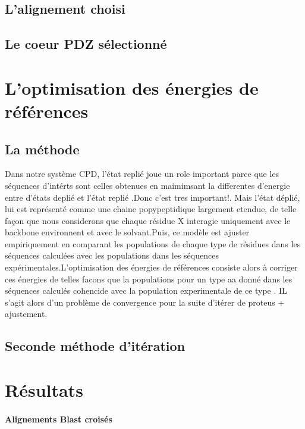 \subsection{L'alignement choisi}

\subsection{Le coeur PDZ sélectionné}


\section{L'optimisation des énergies de références} 
\label{sec:optERef}
\subsection{La méthode}
Dans notre système CPD, l'état replié joue un role important parce que les séquences d'intérts sont celles obtenues en maimimsant la differentes d'energie entre d'états deplié et l'état replié .Donc c'est tres important!.
Mais l'état déplié, lui est représenté comme une chaine popypeptidique largement etendue, de telle façon que nous considerons que chaque résidue X interagie uniquement avec le backbone environnent et avec le solvant.Puis, ce modèle est ajuster empiriquement en comparant les populations de chaque type de résidues dans les séquences calculées avec les populations dans les séquences expérimentales.L'optimisation des énergies de références consiste alors à corriger ces énergies de telles facons que la populations pour un type aa donné dans les séquences calculés cohencide avec la population experimentale de ce type . IL s'agit alors d'un problème de convergence pour la suite d'itérer de proteus + ajustement.

\subsection{Seconde méthode d'itération}

\section{Résultats} 


\paragraph{Alignements Blast croisés}


